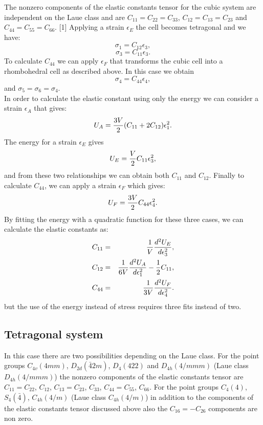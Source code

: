 \documentclass[12pt,a4paper]{article}
\begin{document}
The nonzero components of the elastic constants tensor for the cubic system
are independent on the Laue class and are $C_{11}=C_{22}=C_{33}$,
$C_{12}=C_{13}=C_{23}$ and $C_{44}=C_{55}=C_{66}$. [1]
Applying a strain $\epsilon_E$ the cell becomes tetragonal and we have:
\begin{equation}
\sigma_{1} = C_{12} \epsilon_3,
\end{equation}
\begin{equation}
\sigma_{3} = C_{11} \epsilon_3.
\end{equation}
To calculate $C_{44}$ we can apply $\epsilon_F$ that
transforms the cubic cell into a rhombohedral cell as described above. In
this case we obtain
\begin{equation}
\sigma_{4} = C_{44} \epsilon_4,
\end{equation}
and $\sigma_{5} = \sigma_{6} = \sigma_{4}$. \\
In order to calculate the elastic constant using only the energy
we can consider a strain $\epsilon_A$ that gives:
\begin{equation}
U_A = {3 V \over 2} (C_{11} + 2C_{12}) \epsilon_1^2.
\end{equation}
The energy for a strain $\epsilon_E$ gives
\begin{equation}
U_E = {V \over 2} C_{11} \epsilon_3^2,
\end{equation}
and from these two relationships we can obtain both $C_{11}$ and $C_{12}$.
Finally to calculate $C_{44}$, we can apply a strain $\epsilon_F$ 
which gives:
\begin{equation}
U_F = {3 V \over 2} C_{44} \epsilon_4^2.
\end{equation}
By fitting the energy with a quadratic function for these three cases,
we can calculate the elastic constants as:
\begin{eqnarray}
C_{11}&=&{1 \over V} {d^2 U_E \over d \epsilon_3^2}, \\ 
C_{12}&=&{1 \over 6 V} {d^2 U_A \over d \epsilon_1^2}  - {1\over 2} C_{11}, \\
C_{44}&=&{1 \over 3 V} {d^2 U_F \over d \epsilon_4^2}.
\end{eqnarray}
but the use of the energy instead of stress requires three fits instead
of two. 

\subsection{\color{web-blue}Tetragonal system}
In this case there are two possibilities depending on the Laue class.
For the point groups $C_{4v} (4mm)$, $D_{2d} (\bar42m)$, $D_4 (422)$ and
$D_{4h} (4/mmm)$ (Laue class $D_{4h} (4/mmm)$) the nonzero components of the 
elastic constants tensor are
$C_{11}=C_{22}$, $C_{12}$, $C_{13}=C_{23}$, $C_{33}$, $C_{44}=C_{55}$, 
$C_{66}$.
For the point groups $C_{4} (4)$, $S_{4} (\bar4)$, $C_{4h} (4/m)$ (Laue class
$C_{4h} (4/m)$) in addition to the components of the elastic constants tensor
discussed above also the $C_{16}=-C_{26}$ components are non zero.
\end{document}
